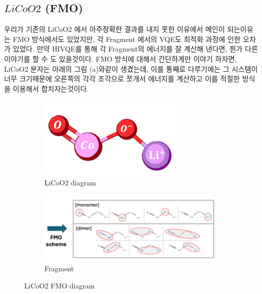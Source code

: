\documentclass[11pt]{article}
\begin{document}
\subsection{\(LiCoO2\) (FMO)}
우리가 기존의 LiCoO2 에서 아주정확한 결과를 내지 못한 이유에서 메인이 되는이유는 FMO 방식에서도 있었지만, 각 Fragment 에서의 VQE도 최적화 과정에 인한 오차가 있었다. 
만약 HIVQE를 통해 각 Fragment의 에너지를 잘 계산해 낸다면, 뭔가 다른 이야기를 할 수 도 있을것이다. FMO 방식에 대해서 간단하게만 이야기 하자면, LiCoO2 분자는 아래의 그림 (a)와같이 생겼는데, 
이를 통째로 다루기에는 그 시스템이 너무 크기때문에 오른쪽의 각각 조각으로 쪼개서 에너지를 계산하고 이를 적절한 방식을 이용해서 합치자는것이다. 
\begin{figure}[H]
  \centering
  \begin{subfigure}[b]{0.3\textwidth}
    \includegraphics[width=\textwidth]{fig/LiCoO2.png}
    \caption{LiCoO2 diagram}
    \label{fig:first}
  \end{subfigure}
  \hfill
  \vrule width 1pt  %
  \hfill
  \begin{subfigure}[b]{0.6\textwidth}
    \includegraphics[width=\textwidth]{fig/LiCoO2_FMO.png}
    \caption{Fragment}
    \label{fig:second}
  \end{subfigure}
  \caption{LiCoO2 FMO diagram}
  \label{fig:two_figures_side_by_side}
\end{figure}
\end{document}

